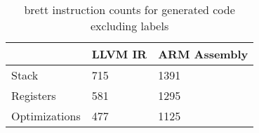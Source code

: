 \begin{table}[h!]
\centering
\begin{tabular}{p{}p{}p{}}
  \hline
 & LLVM IR & ARM Assembly \\ 
  \hline
Stack & 715 & 1391 \\ 
  Registers & 581 & 1295 \\ 
  Optimizations & 477 & 1125 \\ 
   \hline
\end{tabular}
\caption{brett instruction counts for generated code excluding labels}
\end{table}
